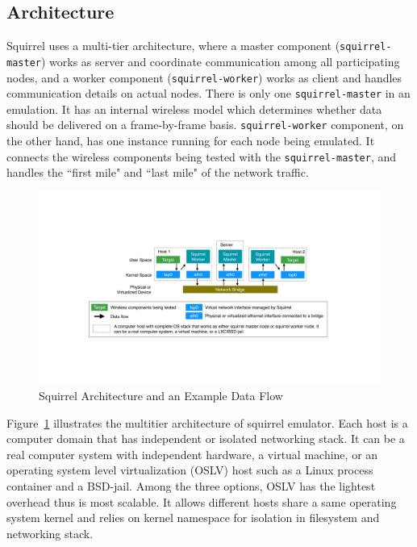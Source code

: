 \documentclass[12pt]{report}
\begin{document}
\subsection{Architecture}
Squirrel uses a multi-tier architecture, where a master component (\texttt{squirrel-master}) works as server and coordinate communication among all participating nodes, and a worker component (\texttt{squirrel-worker}) works as client and handles communication details on actual nodes. There is only one \texttt{squirrel-master} in an emulation. It has an internal wireless model which determines whether data should be delivered on a frame-by-frame basis. \texttt{squirrel-worker} component, on the other hand, has one instance running for each node being emulated. It connects the wireless components being tested with the \texttt{squirrel-master}, and handles the ``first mile" and ``last mile" of the network traffic.

\begin{figure}[h]
  \begin{center}
    \includegraphics[width=\textwidth]{figures/squirrelArch.pdf}
    \caption{\label{fig:squirrel_arch}Squirrel Architecture and an Example Data Flow}
  \end{center}
\end{figure}

Figure~\ref{fig:squirrel_arch} illustrates the multitier architecture of squirrel emulator. Each host is a computer domain that has independent or isolated networking stack. It can be a real computer system with independent hardware, a virtual machine, or an operating system level virtualization (OSLV) host such as a Linux process container \cite{menage2007adding} and a BSD-jail. Among the three options, OSLV has the lightest overhead thus is most scalable. It allows different hosts share a same operating system kernel and relies on kernel namespace for isolation in filesystem and networking stack.
\end{document}
